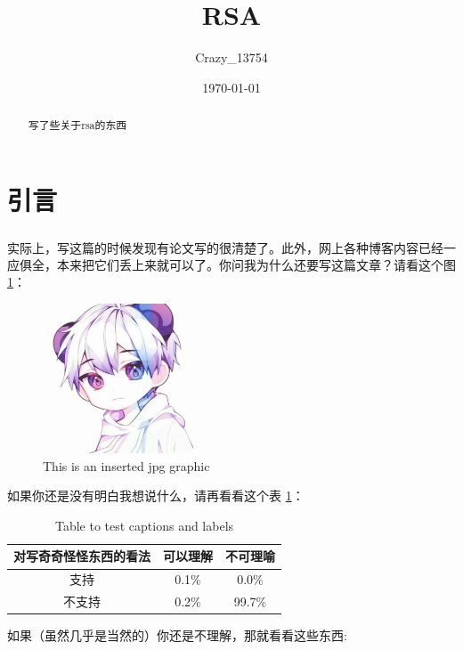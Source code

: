 \documentclass[a4paper]{article}  %
\title{\heiti\zihao{2} RSA}
\author{\songti Crazy\_13754}
\date{\today}
\newcommand{\upcite}[1]{\textsuperscript{\textsuperscript{\cite{#1}}}} %
\begin{document}
    \maketitle
\begin{abstract}
    写了些关于rsa的东西
\end{abstract}
\tableofcontents
\section[引言]{引言}

实际上，写这篇的时候发现有论文写的很清楚了\upcite{chenchuanbo2006rsa}。此外，网上各种博客内容已经一应俱全，本来把它们丢上来就可以了。你问我为什么还要写这篇文章？请看这个图 \ref{fig:rsa1}：

\begin{figure}[htbp]
    \centering
    \includegraphics[width=1.77in,height=1.75in]{contents/rsa1.jpg}
    \caption{This is an inserted jpg graphic}
    \label{fig:rsa1}
    \end{figure}

如果你还是没有明白我想说什么，请再看看这个表 \ref{table:1}：

\begin{table}[h!]
    \centering
    \begin{tabular}{ c c c } 
        \hline
        对写奇奇怪怪东西的看法 & 可以理解 & 不可理喻 \\
        \hline
        支持 & 0.1\% & 0.0\% \\ 
        不支持 & 0.2\% & 99.7\% \\ 
        \hline
       \end{tabular}
    \caption{Table to test captions and labels}
    \label{table:1}
    \end{table}

如果（虽然几乎是当然的）你还是不理解，那就看看这些东西:
\end{document}
